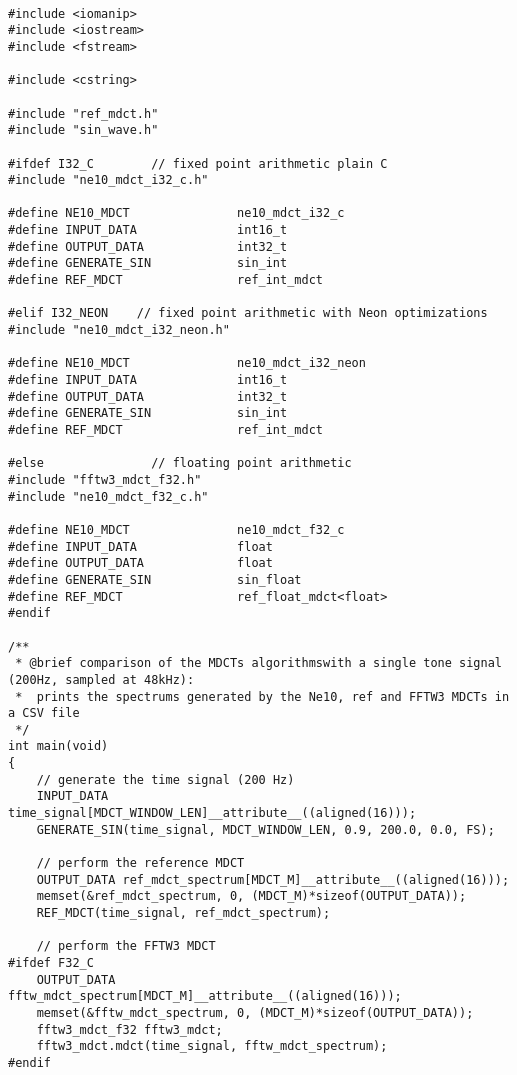 \documentclass{article}
\begin{document}
\paragraph{}
\lstset{language=C++}
\begin{lstlisting}
#include <iomanip>
#include <iostream>
#include <fstream>

#include <cstring>

#include "ref_mdct.h"
#include "sin_wave.h"

#ifdef I32_C        // fixed point arithmetic plain C
#include "ne10_mdct_i32_c.h"

#define NE10_MDCT               ne10_mdct_i32_c
#define INPUT_DATA              int16_t
#define OUTPUT_DATA             int32_t
#define GENERATE_SIN            sin_int
#define REF_MDCT                ref_int_mdct

#elif I32_NEON    // fixed point arithmetic with Neon optimizations
#include "ne10_mdct_i32_neon.h"

#define NE10_MDCT               ne10_mdct_i32_neon
#define INPUT_DATA              int16_t
#define OUTPUT_DATA             int32_t
#define GENERATE_SIN            sin_int
#define REF_MDCT                ref_int_mdct

#else               // floating point arithmetic
#include "fftw3_mdct_f32.h"
#include "ne10_mdct_f32_c.h"

#define NE10_MDCT               ne10_mdct_f32_c
#define INPUT_DATA              float
#define OUTPUT_DATA             float
#define GENERATE_SIN            sin_float
#define REF_MDCT                ref_float_mdct<float>
#endif

/**
 * @brief comparison of the MDCTs algorithmswith a single tone signal (200Hz, sampled at 48kHz):
 *  prints the spectrums generated by the Ne10, ref and FFTW3 MDCTs in a CSV file
 */
int main(void)
{
    // generate the time signal (200 Hz)
    INPUT_DATA time_signal[MDCT_WINDOW_LEN]__attribute__((aligned(16)));
    GENERATE_SIN(time_signal, MDCT_WINDOW_LEN, 0.9, 200.0, 0.0, FS);

    // perform the reference MDCT
    OUTPUT_DATA ref_mdct_spectrum[MDCT_M]__attribute__((aligned(16)));
    memset(&ref_mdct_spectrum, 0, (MDCT_M)*sizeof(OUTPUT_DATA));
    REF_MDCT(time_signal, ref_mdct_spectrum);

    // perform the FFTW3 MDCT
#ifdef F32_C
    OUTPUT_DATA fftw_mdct_spectrum[MDCT_M]__attribute__((aligned(16)));
    memset(&fftw_mdct_spectrum, 0, (MDCT_M)*sizeof(OUTPUT_DATA));
    fftw3_mdct_f32 fftw3_mdct;
    fftw3_mdct.mdct(time_signal, fftw_mdct_spectrum);
#endif


\end{lstlisting}
\end{document}
